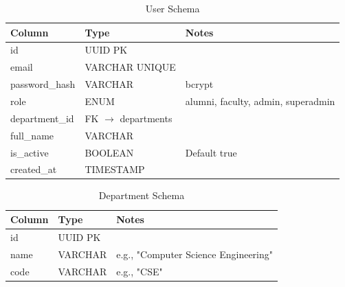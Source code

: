 {\renewcommand{\arraystretch}{1.5}%
\setlength{\tabcolsep}{8pt}%

\begin{table}[h]
    \centering
    \caption{User Schema}
    \begin{tabularx}{\textwidth}{|p{}|p{}|X|}
        \hline
        \textbf{Column} & \textbf{Type} & \textbf{Notes} \\ \hline
        id & UUID PK & \\ \hline
        email & VARCHAR UNIQUE & \\ \hline
        password\_hash & VARCHAR & bcrypt \\ \hline
        role & ENUM & alumni, faculty, admin, superadmin \\ \hline
        department\_id & FK $\rightarrow$ departments & \\ \hline
        full\_name & VARCHAR & \\ \hline
        is\_active & BOOLEAN & Default true \\ \hline
        created\_at & TIMESTAMP & \\ \hline
    \end{tabularx}
\end{table}

\begin{table}[h]
    \centering
    \caption{Department Schema}
    \begin{tabularx}{\textwidth}{|p{}|p{}|X|}
        \hline
        \textbf{Column} & \textbf{Type} & \textbf{Notes} \\ \hline
        id & UUID PK & \\ \hline
        name & VARCHAR & e.g., "Computer Science Engineering" \\ \hline
        code & VARCHAR & e.g., "CSE" \\ \hline
    \end{tabularx}
\end{table}

}
